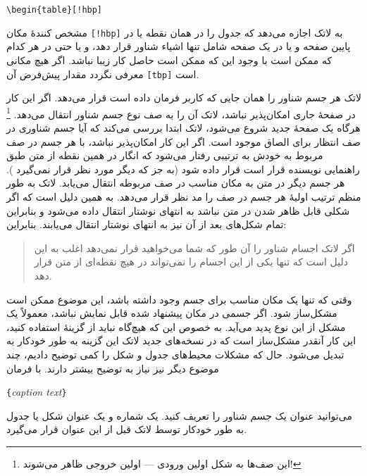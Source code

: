 \begin{code}
\verb|\begin{table}[!hbp]|
\end{code}

\noindent مشخص کنندهٔ مکان  \verb|[!hbp]| 
به لاتک اجازه می‌دهد که جدول را در همان نقطه یا در پایین صفحه و یا در یک صفحه شامل تنها اشیاء شناور قرار دهد، و یا حتی در هر 
کدام که ممکن است با وجود این که ممکن است حاصل کار زیبا نباشد. اگر هیچ مکانی معرفی نگردد مقدار پیش‌فرض آن 
 \verb|[tbp]|
است.

لاتک هر جسم شناور را همان جایی  که کاربر فرمان داده است قرار می‌دهد. اگر این کار در صفحهٔ جاری امکان‌پذیر نباشد، لاتک آن را به 
صف نوع جسم شناور انتقال می‌دهد.%
\footnote{این صف‌ها به شکل اولین ورودی --- اولین خروجی  ظاهر می‌شوند!}
هرگاه یک صفحهٔ جدید شروع می‌شود، لاتک ابتدا بررسی می‌کند که آیا جسم شناوری در صف انتظار برای الصاق موجود است. اگر این کار امکان‌پذیر نباشد، با هر جسم در صف مربوط به خودش به ترتیبی رفتار می‌شود که انگار در همین نقطه از متن طبق راهنمایی نویسنده قرار است قرار داده شود (به جز 
 که دیگر مورد نظر قرار نمی‌گیرد
). هر جسم دیگر در متن به مکان مناسب در صف مربوطه انتقال می‌یابد. لاتک به طور منظم ترتیب اولیهٔ هر جسم در صف را مد نظر قرار می‌دهد. به همین دلیل است که اگر شکلی قابل ظاهر شدن در متن نباشد به انتهای نوشتار انتقال داده می‌شود و بنابراین تمام شکل‌های بعد از آن نیز به انتهای نوشتار انتقال می‌یابند. بنابراین:

\begin{quote}
اگر لاتک اجسام شناور را آن طور که شما می‌خواهید قرار نمی‌دهد اغلب به این دلیل است که تنها یکی از این اجسام را نمی‌تواند در هیچ نقطه‌ای از متن قرار دهد.
\end{quote}                 

وقتی که تنها یک مکان مناسب برای جسم وجود داشته باشد، این موضوع ممکن است مشکل‌\-ساز شود. اگر جسمی در مکان پیشنهاد شده قابل نمایش نباشد، 
معمولاً یک مشکل از این نوع پدید می‌آید. به خصوص این که هیچ‌گاه نباید از گزینهٔ 
\lr{[h]}
استفاده کنید، این کار آنقدر مشکل‌\-ساز است که در نسخه‌های جدید لاتک این گزینه به طور خودکار به 
\lr{[ht]}
تبدیل می‌شود.
\noindent حال که مشکلات محیط‌های جدول و شکل را کمی توضیح دادیم، چند موضوع دیگر نیز نیاز به توضیح بیشتر دارند. با فرمان


\begin{lscommand}
\verb|{|\emph{caption text}\verb|}|
\end{lscommand}

\noindent 
می‌توانید عنوان یک جسم شناور را تعریف کنید. یک شماره و یک عنوان شکل یا جدول به طور خودکار توسط لاتک قبل از این عنوان قرار می‌گیرد.

